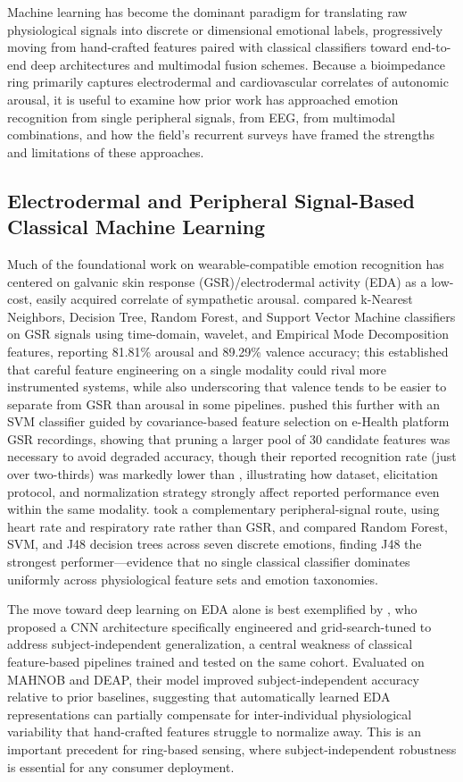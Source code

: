 Machine learning has become the dominant paradigm for translating raw physiological signals into discrete or dimensional emotional labels, progressively moving from hand-crafted features paired with classical classifiers toward end-to-end deep architectures and multimodal fusion schemes. Because a bioimpedance ring primarily captures electrodermal and cardiovascular correlates of autonomic arousal, it is useful to examine how prior work has approached emotion recognition from single peripheral signals, from EEG, from multimodal combinations, and how the field's recurrent surveys have framed the strengths and limitations of these approaches.

\subsection{Electrodermal and Peripheral Signal-Based Classical Machine Learning}

Much of the foundational work on wearable-compatible emotion recognition has centered on galvanic skin response (GSR)/electrodermal activity (EDA) as a low-cost, easily acquired correlate of sympathetic arousal. \cite{ayata2017emotion} compared k-Nearest Neighbors, Decision Tree, Random Forest, and Support Vector Machine classifiers on GSR signals using time-domain, wavelet, and Empirical Mode Decomposition features, reporting 81.81\% arousal and 89.29\% valence accuracy; this established that careful feature engineering on a single modality could rival more instrumented systems, while also underscoring that valence tends to be easier to separate from GSR than arousal in some pipelines. \cite{fan2023human} pushed this further with an SVM classifier guided by covariance-based feature selection on e-Health platform GSR recordings, showing that pruning a larger pool of 30 candidate features was necessary to avoid degraded accuracy, though their reported recognition rate (just over two-thirds) was markedly lower than \cite{ayata2017emotion}, illustrating how dataset, elicitation protocol, and normalization strategy strongly affect reported performance even within the same modality. \cite{kocaleva2025emotion} took a complementary peripheral-signal route, using heart rate and respiratory rate rather than GSR, and compared Random Forest, SVM, and J48 decision trees across seven discrete emotions, finding J48 the strongest performer---evidence that no single classical classifier dominates uniformly across physiological feature sets and emotion taxonomies.

The move toward deep learning on EDA alone is best exemplified by \cite{machot2019deep}, who proposed a CNN architecture specifically engineered and grid-search-tuned to address subject-independent generalization, a central weakness of classical feature-based pipelines trained and tested on the same cohort. Evaluated on MAHNOB and DEAP, their model improved subject-independent accuracy relative to prior baselines, suggesting that automatically learned EDA representations can partially compensate for inter-individual physiological variability that hand-crafted features struggle to normalize away. This is an important precedent for ring-based sensing, where subject-independent robustness is essential for any consumer deployment.

